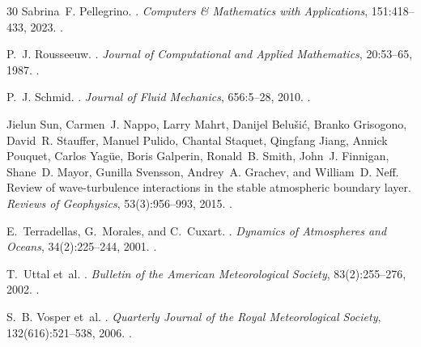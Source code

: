 \begin{thebibliography}{30}
Sabrina~F. Pellegrino.
.
\newblock \emph{Computers \& Mathematics with Applications}, 151:418--433, 2023.
\newblock {}.

P.~J. Rousseeuw.
.
\newblock \emph{Journal of Computational and Applied Mathematics}, 20:53--65, 1987.
\newblock {}.

P.~J. Schmid.
.
\newblock \emph{Journal of Fluid Mechanics}, 656:5--28, 2010.
\newblock {}.

Jielun Sun, Carmen~J. Nappo, Larry Mahrt, Danijel Belu\v{s}i\'{c}, Branko Grisogono, David~R. Stauffer, Manuel Pulido, Chantal Staquet, Qingfang Jiang, Annick Pouquet, Carlos Yag\"{u}e, Boris Galperin, Ronald~B. Smith, John~J. Finnigan, Shane~D. Mayor, Gunilla Svensson, Andrey~A. Grachev, and William~D. Neff.
\newblock Review of wave-turbulence interactions in the stable atmospheric boundary layer.
\newblock \emph{Reviews of Geophysics}, 53(3):956--993, 2015.
\newblock {}.

E.~Terradellas, G.~Morales, and C.~Cuxart.
.
\newblock \emph{Dynamics of Atmospheres and Oceans}, 34(2):225--244, 2001.
\newblock {}.

T.~Uttal et~al.
.
\newblock \emph{Bulletin of the American Meteorological Society}, 83(2):255--276, 2002.
\newblock {}.

S.~B. Vosper et~al.
.
\newblock \emph{Quarterly Journal of the Royal Meteorological Society}, 132(616):521--538, 2006.
\newblock {}.

\end{thebibliography}